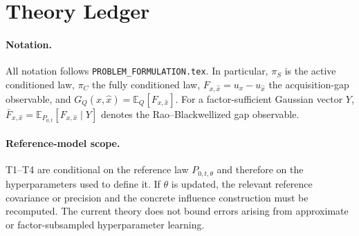 %
%

\section{Theory Ledger}
\label{sec:theory-ledger}

\paragraph{Notation.}
All notation follows \texttt{PROBLEM\_FORMULATION.tex}.  In particular,
$\pi_S$ is the active conditioned law, $\pi_C$ the fully conditioned law,
$F_{x,\widehat x}=u_x-u_{\widehat x}$ the acquisition-gap observable, and
$G_Q(x,\widehat x)=\mathbb E_Q[F_{x,\widehat x}]$.  For a factor-sufficient
Gaussian vector $Y$, $\bar F_{x,\widehat x}
=\mathbb E_{P_{0,t}}[F_{x,\widehat x}\mid Y]$ denotes the Rao--Blackwellized
gap observable.

\paragraph{Reference-model scope.}
T1--T4 are conditional on the reference law $P_{0,t,\theta}$ and therefore on
the hyperparameters used to define it.  If $\theta$ is updated, the relevant
reference covariance or precision and the concrete influence construction must
be recomputed.  The current theory does not bound errors arising from
approximate or factor-subsampled hyperparameter learning.

